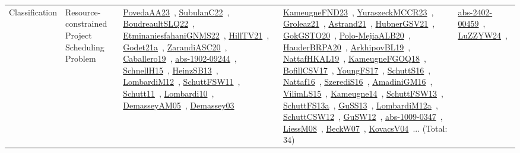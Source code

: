 {\begin{longtable}{lp{3cm}>{\raggedright\arraybackslash}p{6cm}>{\raggedright\arraybackslash}p{6cm}>{\raggedright\arraybackslash}p{8cm}}
Classification & Resource-constrained Project Scheduling Problem & \href{../works/PovedaAA23.pdf}{PovedaAA23}~\cite{PovedaAA23}, \href{../works/SubulanC22.pdf}{SubulanC22}~\cite{SubulanC22}, \href{../works/BoudreaultSLQ22.pdf}{BoudreaultSLQ22}~\cite{BoudreaultSLQ22}, \href{../works/EtminaniesfahaniGNMS22.pdf}{EtminaniesfahaniGNMS22}~\cite{EtminaniesfahaniGNMS22}, \href{../works/HillTV21.pdf}{HillTV21}~\cite{HillTV21}, \href{../works/Godet21a.pdf}{Godet21a}~\cite{Godet21a}, \href{../works/ZarandiASC20.pdf}{ZarandiASC20}~\cite{ZarandiASC20}, \href{../works/Caballero19.pdf}{Caballero19}~\cite{Caballero19}, \href{../works/abs-1902-09244.pdf}{abs-1902-09244}~\cite{abs-1902-09244}, \href{../works/SchnellH15.pdf}{SchnellH15}~\cite{SchnellH15}, \href{../works/HeinzSB13.pdf}{HeinzSB13}~\cite{HeinzSB13}, \href{../works/LombardiM12.pdf}{LombardiM12}~\cite{LombardiM12}, \href{../works/SchuttFSW11.pdf}{SchuttFSW11}~\cite{SchuttFSW11}, \href{../works/Schutt11.pdf}{Schutt11}~\cite{Schutt11}, \href{../works/Lombardi10.pdf}{Lombardi10}~\cite{Lombardi10}, \href{../works/DemasseyAM05.pdf}{DemasseyAM05}~\cite{DemasseyAM05}, \href{../works/Demassey03.pdf}{Demassey03}~\cite{Demassey03} & \href{../works/KameugneFND23.pdf}{KameugneFND23}~\cite{KameugneFND23}, \href{../works/YuraszeckMCCR23.pdf}{YuraszeckMCCR23}~\cite{YuraszeckMCCR23}, \href{../works/Groleaz21.pdf}{Groleaz21}~\cite{Groleaz21}, \href{../works/Astrand21.pdf}{Astrand21}~\cite{Astrand21}, \href{../works/HubnerGSV21.pdf}{HubnerGSV21}~\cite{HubnerGSV21}, \href{../works/GokGSTO20.pdf}{GokGSTO20}~\cite{GokGSTO20}, \href{../works/Polo-MejiaALB20.pdf}{Polo-MejiaALB20}~\cite{Polo-MejiaALB20}, \href{../works/HauderBRPA20.pdf}{HauderBRPA20}~\cite{HauderBRPA20}, \href{../works/ArkhipovBL19.pdf}{ArkhipovBL19}~\cite{ArkhipovBL19}, \href{../works/NattafHKAL19.pdf}{NattafHKAL19}~\cite{NattafHKAL19}, \href{../works/KameugneFGOQ18.pdf}{KameugneFGOQ18}~\cite{KameugneFGOQ18}, \href{../works/BofillCSV17.pdf}{BofillCSV17}~\cite{BofillCSV17}, \href{../works/YoungFS17.pdf}{YoungFS17}~\cite{YoungFS17}, \href{../works/SchuttS16.pdf}{SchuttS16}~\cite{SchuttS16}, \href{../works/Nattaf16.pdf}{Nattaf16}~\cite{Nattaf16}, \href{../works/SzerediS16.pdf}{SzerediS16}~\cite{SzerediS16}, \href{../works/AmadiniGM16.pdf}{AmadiniGM16}~\cite{AmadiniGM16}, \href{../works/VilimLS15.pdf}{VilimLS15}~\cite{VilimLS15}, \href{../works/Kameugne14.pdf}{Kameugne14}~\cite{Kameugne14}, \href{../works/SchuttFSW13.pdf}{SchuttFSW13}~\cite{SchuttFSW13}, \href{../works/SchuttFS13a.pdf}{SchuttFS13a}~\cite{SchuttFS13a}, \href{../works/GuSS13.pdf}{GuSS13}~\cite{GuSS13}, \href{../works/LombardiM12a.pdf}{LombardiM12a}~\cite{LombardiM12a}, \href{../works/SchuttCSW12.pdf}{SchuttCSW12}~\cite{SchuttCSW12}, \href{../works/GuSW12.pdf}{GuSW12}~\cite{GuSW12}, \href{../works/abs-1009-0347.pdf}{abs-1009-0347}~\cite{abs-1009-0347}, \href{../works/LiessM08.pdf}{LiessM08}~\cite{LiessM08}, \href{../works/BeckW07.pdf}{BeckW07}~\cite{BeckW07}, \href{../works/KovacsV04.pdf}{KovacsV04}~\cite{KovacsV04}... (Total: 34) & \href{../works/abs-2402-00459.pdf}{abs-2402-00459}~\cite{abs-2402-00459}, \href{../works/LuZZYW24.pdf}{LuZZYW24}~\cite{LuZZYW24}, 
\end{longtable}}
